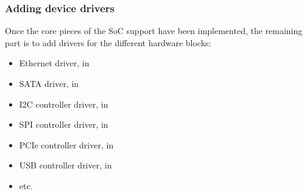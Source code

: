 \begin{frame}
  \frametitle{Adding device drivers}
  Once the core pieces of the SoC support have been implemented, the
  remaining part is to add drivers for the different hardware blocks:
  \begin{itemize}
  \item Ethernet driver, in 
  \item SATA driver, in 
  \item I2C controller driver, in 
  \item SPI controller driver, in 
  \item PCIe controller driver, in 
  \item USB controller driver, in 
  \item etc.
  \end{itemize}
\end{frame}

